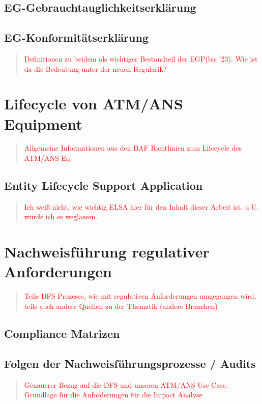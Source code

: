         \subsection{EG-Gebrauchtauglichkeitserklärung}
        \subsection{EG-Konformitätserklärung}

\begin{quote}
\textcolor{red}{Definitionen zu beidem als wichtiger Bestandteil der EGP(bis '23). Wie ist da die Bedeutung unter der neuen Regularik?}
\end{quote}
        
        \pagebreak
    \section{Lifecycle von ATM/ANS Equipment}

    \begin{quote}
\textcolor{red}{Allgemeine Informationen aus den BAF Richtlinien zum Lifecycle des ATM/ANS Eq.}
\end{quote}
    
        \subsection{Entity Lifecycle Support Application}

\begin{quote}
\textcolor{red}{Ich weiß nicht, wie wichtig ELSA hier für den Inhalt dieser Arbeit ist. u.U. würde ich es weglassen.}
\end{quote}
    \pagebreak
    \section{Nachweisführung regulativer Anforderungen}

\begin{quote}
\textcolor{red}{Teils DFS Prozesse, wie mit regulativen Anforderungen umgegangen wird, teils auch andere Quellen zu der Thematik (andere Branchen)}
\end{quote}
    
        \subsection{Compliance Matrizen}
        \subsection{Folgen der Nachweisführungsprozesse / Audits}
\begin{quote}
\textcolor{red}{Genauerer Bezug auf die DFS und unseren ATM/ANS Use Case. Grundlage für die Anforderungen für die Impact Analyse}
\end{quote}
        